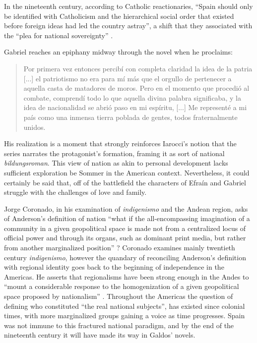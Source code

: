 \documentclass[12pt]{report}
\begin{document}
In the nineteenth century, according to Catholic reactionaries, \enquote{Spain should only be identified with Catholicism and the hierarchical social order that existed before foreign ideas had led the country astray}, a shift that they associated with the \enquote{plea for national sovereignty} \cite[149]{Storm2004}.


Gabriel reaches an epiphany midway through the novel when he proclaims:
\blockquote[{\cite[1127]{Galdos1882}}]{Por primera vez entonces percibí con completa claridad la idea de la patria [...] el patriotismo no era para mí más que el orgullo de pertenecer a aquella casta de matadores de moros. Pero en el momento que procedió al combate, comprendí todo lo que aquella divina palabra significaba, y la idea de nacionalidad se abrió paso en mi espíritu, [...] Me representé a mi país como una inmensa tierra poblada de gentes, todos fraternalmente unidos.}
His realization is a moment that strongly reinforces Iarocci's notion that the series narrates the protagonist's formation, framing it as sort of national \textit{bildungsroman}.
This view of nation as akin to personal development lacks sufficient exploration be Sommer in the American context.
Nevertheless, it could certainly be said that, off of the battlefield the characters of Efraín and Gabriel struggle with the challenges of love and family.

Jorge Coronado, in his examination of \textit{indigenismo} and the Andean region, asks of Anderson's definition of nation \enquote{what if the all-encompassing imagination of a community in a given geopolitical space is made not from a centralized locus of official power and through its organs, such as dominant print media, but rather from another marginalized position} \cite[12]{Coronado2009}?
Coronado examines mainly twentieth century \textit{indigenismo}, however the quandary of reconciling Anderson's definition with regional identity goes back to the beginning of independence in the Americas.
He asserts that regionalisms have been strong enough in the Andes to \enquote{mount a considerable response to the homogenization of a given geopolitical space proposed by nationalism} \cite[12]{Coronado2009}.
Throughout the Americas the question of defining who constituted \enquote{the real national subjects}, has existed since colonial times, with more marginalized groups gaining a voice as time progresses.
Spain was not immune to this fractured national paradigm, and by the end of the nineteenth century it will have made its way in Galdos' novels.
\end{document}

